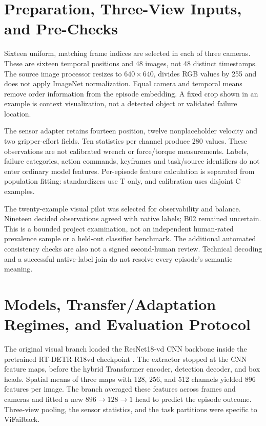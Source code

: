 \section{Preparation, Three-View Inputs, and Pre-Checks}
Sixteen uniform, matching frame indices are selected in each of three cameras. These are
sixteen temporal positions and 48 images, not 48 distinct timestamps. The source image
processor resizes to $640\times640$, divides RGB values by 255 and does not apply
ImageNet normalization. Equal camera and temporal means remove order information from
the episode embedding. A fixed crop shown in an example is context visualization, not a
detected object or validated failure location.

The sensor adapter retains fourteen position, twelve nonplaceholder velocity and two
gripper-effort fields. Ten statistics per channel produce 280 values. These observations
are not calibrated wrench or force/torque measurements. Labels, failure categories,
action commands, keyframes and task/source identifiers do not enter ordinary model
features. Per-episode feature calculation is separated from population fitting:
standardizers use T only, and calibration uses disjoint C examples.

The twenty-example visual pilot was selected for observability and balance. Nineteen
decided observations agreed with native labels; B02 remained uncertain. This is a
bounded project examination, not an independent human-rated prevalence sample or a
held-out classifier benchmark. The additional automated consistency checks are also not
a signed second-human review. Technical decoding and a successful native-label join do
not resolve every episode's semantic meaning.

\section{Models, Transfer/Adaptation Regimes, and Evaluation Protocol}
The original visual branch loaded the ResNet18-vd CNN backbone inside the pretrained
RT-DETR-R18vd checkpoint \citep{Zhao2024RTDETR}. The extractor stopped at the CNN
feature maps, before the hybrid Transformer encoder, detection decoder, and box heads.
Spatial means of three maps with 128, 256, and 512 channels yielded 896 features per
image. The branch averaged these features across frames and cameras and fitted a new
$896\rightarrow128\rightarrow1$ head to predict the episode outcome. Three-view pooling,
the sensor statistics, and the task partitions were specific to ViFailback.

